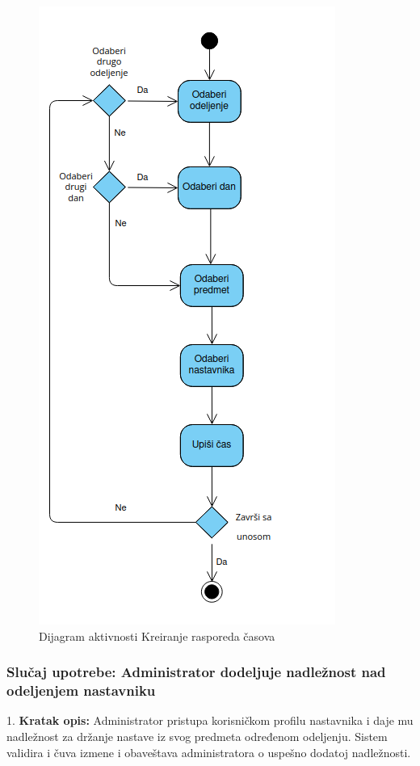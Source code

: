 \documentclass{article}
\begin{document}
\begin{figure} [!ht]
    \begin{center}
        \includegraphics[scale=0.35]{imgs/Dijagram_aktivnosti_administrator_pravi_raspored_casova.png}
    \end{center}
\caption{Dijagram aktivnosti Kreiranje rasporeda časova}
\end{figure}

\newpage
\subsubsection{Slučaj upotrebe: Administrator dodeljuje nadležnost nad odeljenjem nastavniku}
1. \textbf{Kratak opis:} Administrator pristupa korisničkom profilu nastavnika i daje mu nadležnost za držanje nastave iz svog predmeta određenom odeljenju. Sistem validira i čuva izmene i obaveštava administratora o uspešno dodatoj nadležnosti. \\
\end{document}
